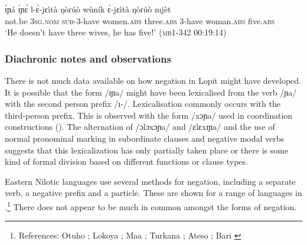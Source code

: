 \documentclass[output=paper,colorlinks,citecolor=brown,draftmode]{langscibook}
\begin{document}
\ea\label{ex:lop:112}
        \gll ɪ́ɲá  ɪ́ɲɛ́  l-ɛ̀-jɛìtà ŋòɾúò wùník ɛ̀-jɛìtà ŋòɾúò mjèt \\ 
             not.be 3\textsc{sg.nom} \textsc{sub-3-}have women.\textsc{abs} three.\textsc{abs} 3-have woman.\textsc{abs} five.\textsc{abs} \\
        \glt ‘He doesn’t have three wives, he has fiveǃ’ (\textsc{mb1-342} 00:19:14)
\z


\subsubsection{Diachronic notes and observations}
\label{sec:lop:4.6.3}
There is not much data available on how negation in Lopit might have developed. It is possible that the form /ɪɲa/ might have been lexicalised from the verb /ɲa/ with the second person prefix /ɪ-/.  Lexicalisation commonly occurs with the third-person prefix.  This is observed with the form /xɔɲa/ used in coordination constructions (). The alternation of /ɔlɔxɔɲa/ and /ɛlɛxɪɲa/ and the use of normal pronominal marking in subordinate clauses and negative modal verbs suggests that this lexicalization has only partially taken place or there is some kind of formal division based on different functions or clause types.

Eastern Nilotic languages use several methods for negation, including a separate verb, a negative prefix and a particle.  These are shown for a range of languages in .\footnote{References: Otuho \citep{Muratori1938}; Lokoya \citep{Westermann1944}; Maa \citep{TuckerEtAl1955}; Turkana \citep{Dimmendaal1983}; Ateso \citep{Barasa2017}; Bari \citep{Spagnolo1933}} There does not appear to be much in common amongst the forms of negation.

\end{document}
